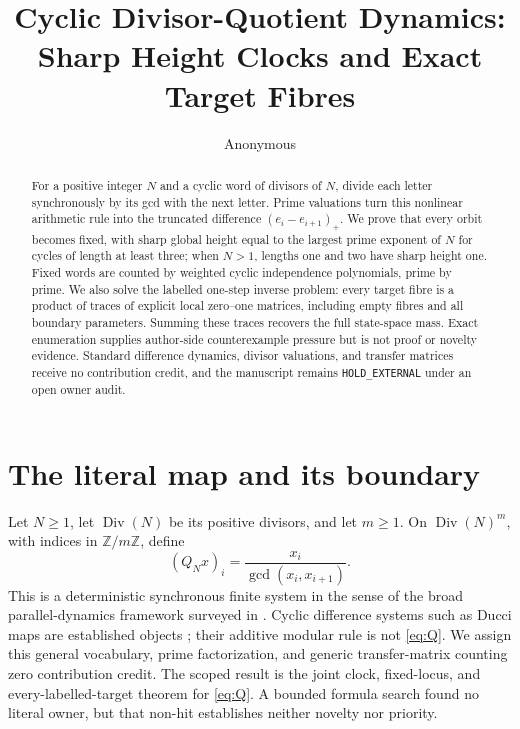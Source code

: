 \documentclass[a4paper,11pt]{amsart}
\title[Cyclic divisor-quotient dynamics]{Cyclic Divisor-Quotient Dynamics:\\
Sharp Height Clocks and Exact Target Fibres}
\author{Anonymous}
\date{}
\theoremstyle{remark}
\newcommand{\Div}{\operatorname{Div}}
\begin{document}
\begin{abstract}
For a positive integer $N$ and a cyclic word of divisors of $N$, divide each
letter synchronously by its gcd with the next letter.  Prime valuations turn
this nonlinear arithmetic rule into the truncated difference
$(e_i-e_{i+1})_+$.  We prove that every orbit becomes fixed, with sharp global
height equal to the largest prime exponent of $N$ for cycles of length at
least three; when $N>1$, lengths one and two have sharp height one.  Fixed words are
counted by weighted cyclic independence polynomials, prime by prime.  We also
solve the labelled one-step inverse problem: every target fibre is a product
of traces of explicit local zero--one matrices, including empty fibres and all
boundary parameters.  Summing these traces recovers the full state-space
mass.  Exact enumeration supplies author-side counterexample pressure but is
not proof or novelty evidence.  Standard difference dynamics, divisor
valuations, and transfer matrices receive no contribution credit, and the
manuscript remains \texttt{HOLD\_EXTERNAL} under an open owner audit.
\end{abstract}

\maketitle

\section{The literal map and its boundary}

Let $N\geq1$, let $\Div(N)$ be its positive divisors, and let $m\geq1$.
On $\Div(N)^m$, with indices in $\mathbb Z/m\mathbb Z$, define
\begin{equation}\label{eq:Q}
 (Q_Nx)_i=\frac{x_i}{\gcd(x_i,x_{i+1})}.
\end{equation}
This is a deterministic synchronous finite system in the sense of the broad
parallel-dynamics framework surveyed in \cite{AledoMartinezValverde2015}.
Cyclic difference systems such as Ducci maps are established objects
\cite{LewisTefft2025}; their additive modular rule is not \eqref{eq:Q}.
We assign this general vocabulary, prime factorization, and generic
transfer-matrix counting zero contribution credit.  The scoped result is the
joint clock, fixed-locus, and every-labelled-target theorem for \eqref{eq:Q}.
A bounded formula search found no literal owner, but that non-hit establishes
neither novelty nor priority.
\end{document}
